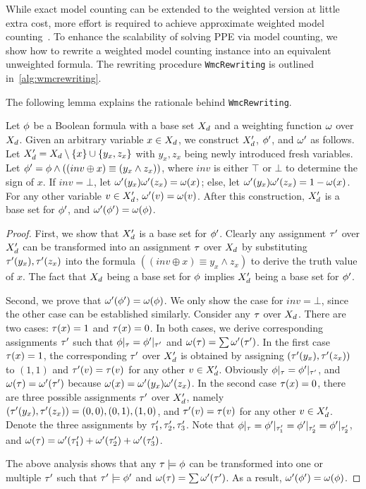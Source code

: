 While exact model counting can be extended to the weighted version at little extra cost,
more effort is required to achieve approximate weighted model counting~\cite{SATHandbook-ModelCounting}.
To enhance the scalability of solving PPE via model counting,
we show how to rewrite a weighted model counting instance into an equivalent unweighted formula.
The rewriting procedure \texttt{WmcRewriting} is outlined in~\cref{alg:wmcrewriting}.

The following lemma explains the rationale behind \texttt{WmcRewriting}.
\begin{lemma}
    \label{lemma:prob-rewrite}
    Let $\phi$ be a Boolean formula with a base set $X_d$ and
    a weighting function $\omega$ over $X_d$.
    Given an arbitrary variable $x\in X_d$,
    we construct $X_d'$, $\phi'$, and $\omega'$ as follows.
    Let $X_d'=X_d\setminus\{x\}\cup\{y_x,z_x\}$ with
    $y_x,z_x$ being newly introduced fresh variables.
    Let $\phi'=\phi \land ((inv \oplus x) \equiv (y_x \land z_x))$,
    where $inv$ is either $\top$ or $\bot$ to determine the sign of $x$.
    If $inv=\bot$, let $\omega'(y_x)\omega'(z_x)=\omega(x)$;
    else, let $\omega'(y_x)\omega'(z_x)=1-\omega(x)$.
    For any other variable $v\in X_d'$,
    $\omega'(v)=\omega(v)$.
    After this construction, $X_d'$ is a base set for $\phi'$, and $\omega'(\phi')=\omega(\phi)$.
\end{lemma}
\begin{proof}
    First, we show that $X_d'$ is a base set for $\phi'$.
    Clearly any assignment $\tau'$ over $X_d'$ can be transformed into
    an assignment $\tau$ over $X_d$ by substituting $\tau'(y_x),\tau'(z_x)$ into the formula
    $((inv \oplus x) \equiv y_x \land z_x)$ to derive the truth value of $x$.
    The fact that $X_d$ being a base set for $\phi$ implies $X_d'$ being a base set for $\phi'$.

    Second, we prove that $\omega'(\phi')=\omega(\phi)$.
    We only show the case for $inv=\bot$,
    since the other case can be established similarly.
    Consider any $\tau$ over $X_d$.
    There are two cases: $\tau(x)=1$ and $\tau(x) = 0$.
    In both cases, we derive corresponding assignments $\tau'$ such that
    $\phi|_{\tau}=\phi'|_{\tau'}$ and
    $\omega(\tau)=\sum\omega'(\tau')$.
    In the first case $\tau(x)=1$,
    the corresponding $\tau'$ over $X_d'$ is obtained by assigning
    $(\tau'(y_x),\tau'(z_x))$ to $(1,1)$ and
    $\tau'(v)=\tau(v)$ for any other $v\in X_d'$.
    Obviously $\phi|_{\tau}=\phi'|_{\tau'}$,
    and $\omega(\tau)=\omega'(\tau')$ because $\omega(x)=\omega'(y_x)\omega'(z_x)$.
    In the second case $\tau(x)=0$,
    there are three possible assignments $\tau'$ over $X_d'$,
    namely $(\tau'(y_x),\tau'(z_x))=(0,0),(0,1),(1,0)$,
    and $\tau'(v)=\tau(v)$ for any other $v\in X_d'$.
    Denote the three assignments by $\tau_1',\tau_2',\tau_3'$.
    Note that $\phi|_{\tau}=\phi'|_{\tau_1'}=\phi'|_{\tau_2'}=\phi'|_{\tau_2'}$,
    and $\omega(\tau)=\omega'(\tau_1')+\omega'(\tau_2')+\omega'(\tau_3')$.

    The above analysis shows that any $\tau\models\phi$ can be transformed into one or multiple $\tau'$
    such that $\tau'\models\phi'$ and $\omega(\tau)=\sum\omega'(\tau')$.
    As a result, $\omega'(\phi')=\omega(\phi)$.
\end{proof}

